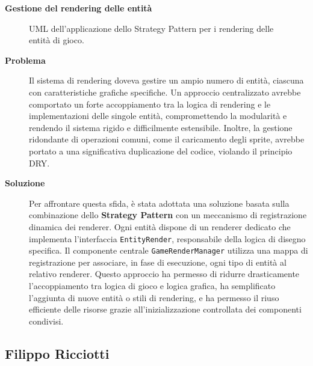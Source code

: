\documentclass[a4paper,12pt]{report}
\begin{document}
\noindent
\textbf{Gestione del rendering delle entità}
\begin{figure}[H]
	\centering{}
	
	\caption{UML dell'applicazione dello Strategy Pattern per i rendering delle entità di gioco.}
	\label{img:GameRenderManager}
\end{figure}
\begin{description}
	\item[\textbf{Problema}]
	      Il sistema di rendering doveva gestire un ampio numero di entità, ciascuna con caratteristiche grafiche specifiche. Un approccio centralizzato avrebbe comportato un forte accoppiamento tra la logica di rendering e
		  le implementazioni delle singole entità, compromettendo la modularità e rendendo il sistema rigido e difficilmente estensibile. Inoltre, la gestione ridondante di operazioni comuni, come il caricamento degli sprite, avrebbe
		  portato a una significativa duplicazione del codice, violando il principio DRY.

	\item[\textbf{Soluzione}]
	      Per affrontare questa sfida, è stata adottata una soluzione basata sulla combinazione dello \textbf{Strategy Pattern} con un meccanismo di registrazione dinamica dei renderer. Ogni entità dispone di un renderer dedicato che implementa l’interfaccia \texttt{EntityRender},
		  responsabile della logica di disegno specifica. Il componente centrale \texttt{GameRenderManager} utilizza una mappa di registrazione per associare, in fase di esecuzione, ogni tipo di entità al relativo renderer.  
	      Questo approccio ha permesso di ridurre drasticamente l’accoppiamento tra logica di gioco e logica grafica, ha semplificato l’aggiunta di nuove entità o stili di rendering, e ha permesso il riuso efficiente delle risorse grazie all’inizializzazione controllata dei componenti condivisi.
\end{description}


\newpage
\subsection{Filippo Ricciotti}
\end{document}
